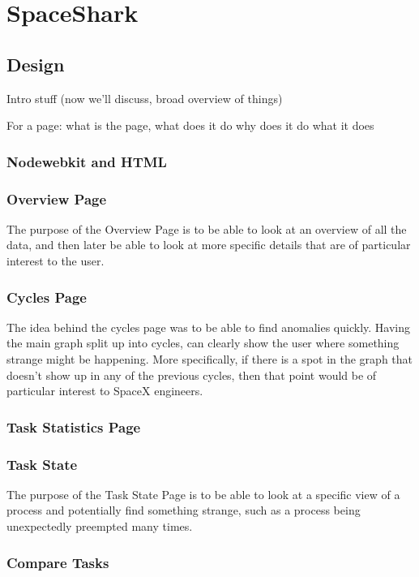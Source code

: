 \documentclass{hmcclinic}
\begin{document}
\chapter{SpaceShark}
\section{Design} %
  Intro stuff (now we'll discuss, broad overview of things) %

  For a page: what is the page, what does it do
              why does it do what it does

  \subsection{Nodewebkit and HTML} %
  \subsection{Overview Page}
  
The purpose of the Overview Page is to be able to look at an overview of all the data, and then later be able to look at more specific details that are of particular interest to the user.
  
  \subsection{Cycles Page}
  
The idea behind the cycles page was to be able to find anomalies quickly. Having the main graph split up into cycles, can clearly show the user where something strange might be happening. More specifically, if there is a spot in the graph that doesn't show up in any of the previous cycles, then that point would be of particular interest to SpaceX engineers.
  
  \subsection{Task Statistics Page}
  \subsection{Task State}
  
The purpose of the Task State Page is to be able to look at a specific view of a process and potentially find something strange, such as a process being unexpectedly preempted many times.
  
  \subsection{Compare Tasks}
\end{document}
